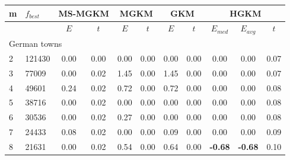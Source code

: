 {\footnotesize
\centering
\begin{longtable}{@{}llccccccccc@{}}
\hline
\multicolumn{1}{l|}{m}  & \multicolumn{1}{l|}{$f_{best}$} & \multicolumn{2}{c|}{MS-MGKM}     & \multicolumn{2}{c|}{MGKM}        & \multicolumn{2}{c|}{GKM}         & \multicolumn{3}{c}{HGKM}               \\ \hline
                        & \multicolumn{1}{l|}{}           & $E$  & \multicolumn{1}{c|}{$t$}  & $E$  & \multicolumn{1}{c|}{$t$}  & $E$  & \multicolumn{1}{c|}{$t$}  & $E_{med}$      & $E_{avg}$      & $t$  \\ \hline
\multicolumn{11}{l}{German towns}                                                                                                                                                                           \\ \hline
\multicolumn{1}{l|}{2}  & \multicolumn{1}{l|}{121430}     & 0.00 & \multicolumn{1}{c|}{0.00} & 0.00 & \multicolumn{1}{c|}{0.00} & 0.00 & \multicolumn{1}{c|}{0.00} & 0.00           & 0.00           & 0.07 \\
\multicolumn{1}{l|}{3}  & \multicolumn{1}{l|}{77009}      & 0.00 & \multicolumn{1}{c|}{0.02} & 1.45 & \multicolumn{1}{c|}{0.00} & 1.45 & \multicolumn{1}{c|}{0.00} & 0.00           & 0.00           & 0.07 \\
\multicolumn{1}{l|}{4}  & \multicolumn{1}{l|}{49601}      & 0.24 & \multicolumn{1}{c|}{0.02} & 0.72 & \multicolumn{1}{c|}{0.00} & 0.72 & \multicolumn{1}{c|}{0.00} & 0.00           & 0.00           & 0.08 \\
\multicolumn{1}{l|}{5}  & \multicolumn{1}{l|}{38716}      & 0.00 & \multicolumn{1}{c|}{0.02} & 0.00 & \multicolumn{1}{c|}{0.00} & 0.00 & \multicolumn{1}{c|}{0.00} & 0.00           & 0.00           & 0.08 \\
\multicolumn{1}{l|}{6}  & \multicolumn{1}{l|}{30536}      & 0.00 & \multicolumn{1}{c|}{0.02} & 0.27 & \multicolumn{1}{c|}{0.00} & 0.00 & \multicolumn{1}{c|}{0.00} & 0.00           & 0.00           & 0.08 \\
\multicolumn{1}{l|}{7}  & \multicolumn{1}{l|}{24433}      & 0.08 & \multicolumn{1}{c|}{0.02} & 0.00 & \multicolumn{1}{c|}{0.00} & 0.09 & \multicolumn{1}{c|}{0.00} & 0.00           & 0.00           & 0.09 \\
\multicolumn{1}{l|}{8}  & \multicolumn{1}{l|}{21631}      & 0.00 & \multicolumn{1}{c|}{0.02} & 0.54 & \multicolumn{1}{c|}{0.00} & 0.64 & \multicolumn{1}{c|}{0.00} & \textbf{-0.68} & \textbf{-0.68} & 0.10 \\

\end{longtable}}
